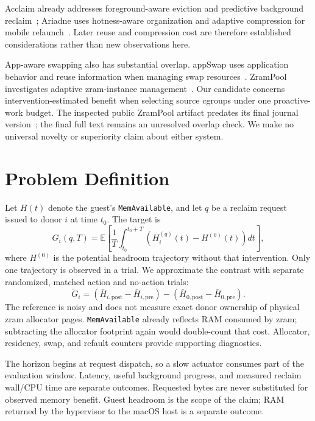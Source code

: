 \documentclass[conference]{IEEEtran}
\begin{document}
Acclaim already addresses foreground-aware eviction and predictive background
reclaim~\cite{acclaim}; Ariadne uses hotness-aware organization and adaptive
compression for mobile relaunch~\cite{ariadne}. Later reuse and compression cost
are therefore established considerations rather than new observations here.

App-aware swapping also has substantial overlap. appSwap uses application
behavior and reuse information when managing swap resources~\cite{appswap}.
ZramPool investigates adaptive zram-instance management~\cite{zrampool}. Our
candidate concerns intervention-estimated benefit when selecting source cgroups
under one proactive-work budget. The inspected public ZramPool artifact
predates its final journal version~\cite{zrampoolcode}; the final full text
remains an unresolved overlap check. We make no universal novelty or
superiority claim about either system.

\section{Problem Definition}
Let $H(t)$ denote the guest's \texttt{MemAvailable}, and let $q$ be a reclaim
request issued to donor $i$ at time $t_0$. The target is
\begin{equation}
G_i(q,T)=\mathbb{E}\!\left[\frac{1}{T}\int_{t_0}^{t_0+T}
\left(H_i^{(q)}(t)-H^{(0)}(t)\right)dt\right],
\label{eq:target}
\end{equation}
where $H^{(0)}$ is the potential headroom trajectory without that intervention.
Only one trajectory is observed in a trial. We approximate the contrast with
separate randomized, matched action and no-action trials:
\begin{equation}
\widetilde{G}_i =
(\bar H_{i,\mathrm{post}}-\bar H_{i,\mathrm{pre}})
-(\bar H_{0,\mathrm{post}}-\bar H_{0,\mathrm{pre}}).
\label{eq:reference}
\end{equation}
The reference is noisy and does not measure exact donor ownership of physical
zram allocator pages. \texttt{MemAvailable} already reflects RAM consumed by
zram; subtracting the allocator footprint again would double-count that cost.
Allocator, residency, swap, and refault counters provide supporting diagnostics.

The horizon begins at request dispatch, so a slow actuator consumes part of the
evaluation window. Latency, useful background progress, and measured reclaim
wall/CPU time are separate outcomes. Requested bytes are never substituted for
observed memory benefit. Guest headroom is the scope of the claim; RAM returned
by the hypervisor to the macOS host is a separate outcome.
\end{document}
